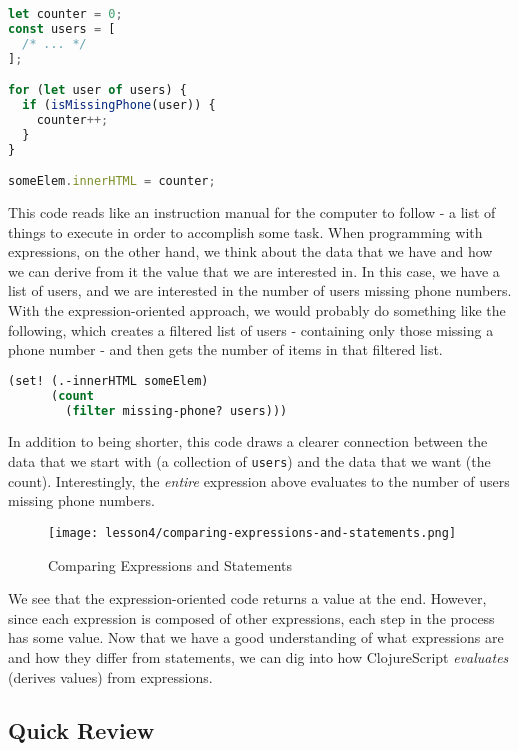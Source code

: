 \documentclass[10pt,twoside,openright]{memoir}
\begin{document}
\begin{lstlisting}[language=JavaScript, caption={Statement-oriented JavaScript code}]
let counter = 0;
const users = [
  /* ... */
];

for (let user of users) {
  if (isMissingPhone(user)) {
    counter++;
  }
}

someElem.innerHTML = counter;
\end{lstlisting}

This code reads like an instruction manual for the computer to follow -
a list of things to execute in order to accomplish some task. When
programming with expressions, on the other hand, we think about the data
that we have and how we can derive from it the value that we are
interested in. In this case, we have a list of users, and we are
interested in the number of users missing phone numbers. With the
expression-oriented approach, we would probably do something like the
following, which creates a filtered list of users - containing only
those missing a phone number - and then gets the number of items in that
filtered list.

\begin{lstlisting}[language=Clojure, caption={Expression-oriented ClojureScript code}]
(set! (.-innerHTML someElem)
      (count
        (filter missing-phone? users)))
\end{lstlisting}


In addition to being shorter, this code draws a clearer connection
between the data that we start with (a collection of \texttt{users}) and
the data that we want (the count). Interestingly, the \emph{entire}
expression above evaluates to the number of users missing phone numbers.


\begin{figure}[h]
\caption{Comparing Expressions and Statements}
\centering
\texttt{[image: lesson4/comparing-expressions-and-statements.png]}
\end{figure}

We see that the expression-oriented code returns a value at the end.
However, since each expression is composed of other expressions, each
step in the process has some value. Now that we have a good
understanding of what expressions are and how they differ from
statements, we can dig into how ClojureScript \emph{evaluates} (derives
values) from expressions.


\subsection{Quick Review}
\end{document}
